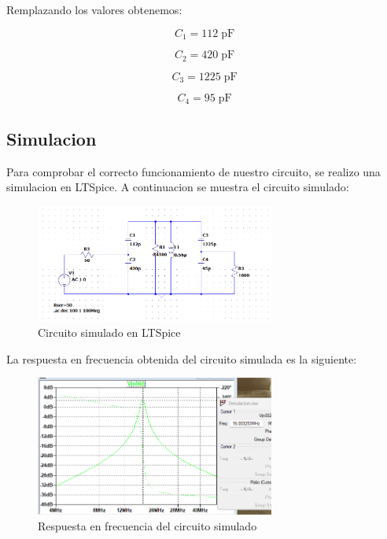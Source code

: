 Remplazando los valores obtenemos:

\begin{equation}
    \boxed{C_1 = 112\; \text{pF}}
\end{equation}

\begin{equation}
    \boxed{C_2 = 420\; \text{pF}}
\end{equation}

\begin{equation}
    \boxed{C_3 = 1225\; \text{pF}}
\end{equation}

\begin{equation}
    \boxed{C_4 = 95\; \text{pF}}
\end{equation}

\newpage
\subsection{Simulacion}

Para comprobar el correcto funcionamiento de nuestro circuito, se realizo una simulacion en LTSpice. A continuacion se muestra el circuito simulado:

\begin{figure}[h]
    \centering
    \includegraphics[width=0.7\textwidth]{Imagenes/circuito.png}
    \caption{Circuito simulado en LTSpice}
\end{figure}

La respuesta en frecuencia obtenida del circuito simulada es la siguiente:

\begin{figure}[h]
    \centering
    \includegraphics[width=0.7\textwidth]{Imagenes/resultado_circuito.png}
    \caption{Respuesta en frecuencia del circuito simulado}
\end{figure}

